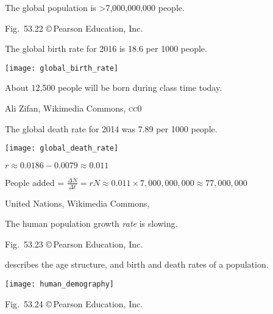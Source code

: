 \documentclass[t]{beamer}
\begin{document}
{
\begin{frame}[b]{The global population is \textgreater7,000,000,000 people.}

	\hfill \tiny Fig.~53.22 \copyright\,Pearson Education, Inc.
\end{frame}
}
%
\begin{frame}[t]{The global birth rate for 2016 is 18.6 per 1000 people.}

	
	\texttt{[image: global\_birth\_rate]}
	
	
	
	\hangpara About 12,500 people will be born during class time today.
	
	\vfilll
	
	\hfill \tiny Ali Zifan, Wikimedia Commons, \textsc{cc0}
\end{frame}
%
\begin{frame}[t]{The global death rate for 2014 was 7.89 per 1000 people.}

	\texttt{[image: global\_death\_rate]}\par
	
	$r \approx 0.0186 - 0.0079 \approx 0.011$\vspace*{\baselineskip}
	
	People added = $\frac{\Delta N}{\Delta t} =rN \approx 0.011 \times 7,000,000,000 \approx 77,000,000$
		
	\vfilll
	
	\hfill \tiny United Nations, Wikimedia Commons, 
\end{frame}
%
{
\begin{frame}[b]{The human population growth \emph{rate} is slowing.}

	\hfill \tiny Fig.~53.23 \copyright\,Pearson Education, Inc.
\end{frame}
}
%
\begin{frame}[t]{ describes the age structure, and birth and death rates of a population.}

	\texttt{[image: human\_demography]}
	
	\vfilll
	
	\hfill \tiny Fig.~53.24 \copyright\,Pearson Education, Inc.
	
\end{frame}
\end{document}
